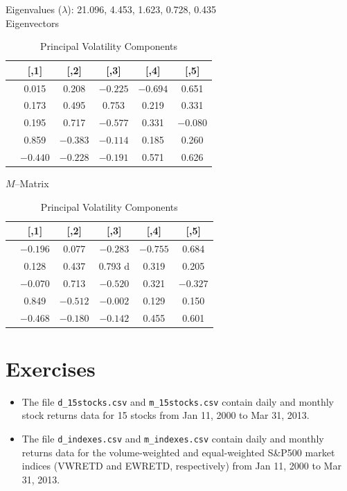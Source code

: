 	\begin{table}[H]
	\centering
	\caption{Principal Volatility Components \label{tab:pvctable}}
	{\small Eigenvalues ($\lambda$): 21.096, 4.453, 1.623, 0.728, 0.435} \\
	
	{\small Eigenvectors}
	
	\hspace{-2.5cm}\begin{tabular}{| l | c | c | c | c | c |} 
        &    [,1]   &    [,2]    &   [,3]    &   [,4]   &     [,5] \\ \hline
	[1,] & 0.015 & 0.208 & $-0.225$ & $-0.694$ &  0.651 \\ \hline
	[2,] & 0.173 & 0.495 & 0.753 & 0.219 & 0.331 \\ \hline
	[3,] & 0.195 & 0.717 & $-0.577$ & 0.331 & $-0.080$ \\ \hline
	[4,] & 0.859 & $-0.383$ & $-0.114$ & 0.185 & 0.260 \\ \hline
	[5,] & $-0.440$ & $-0.228$ & $-0.191$ & 0.571 & 0.626 \\
	\end{tabular}
	
	{\small $M$--Matrix} \\[0.1cm]
	
	\hspace{-2.5cm}\begin{tabular}{| l | c | c | c | c | c |} 
	         &   [,1]   &     [,2]    &     [,3]   &    [,4]   &    [,5] \\ \hline
	[1,] & $-0.196$ & 0.077 & $-0.283$ & $-0.755$ & 0.684 \\ \hline
	[2,] & 0.128 & 0.437 & 0.793 d & 0.319 & 0.205 \\ \hline
	[3,]& $-0.070$ & 0.713 & $-0.520$ & 0.321 & $-0.327$ \\ \hline
	[4,] & 0.849 & $-0.512$ & $-0.002$ & 0.129 & 0.150 \\ \hline
	[5,] & $-0.468$ & $-0.180$ & $-0.142$ & 0.455 & 0.601 \\
	\end{tabular}
	\end{table} \label{in:multimod2}



\section{Exercises}


\prob
\begin{itemize}
\item The file {\tt d\_15stocks.csv} and {\tt m\_15stocks.csv} contain daily and monthly stock returns data for 15 stocks from Jan 11, 2000 to Mar 31, 2013.
\item The file {\tt d\_indexes.csv} and {\tt m\_indexes.csv} contain daily and monthly returns data for the volume-weighted and equal-weighted S\&P500 market indices (VWRETD and EWRETD, respectively) from Jan 11, 2000 to Mar 31, 2013.
\end{itemize}

